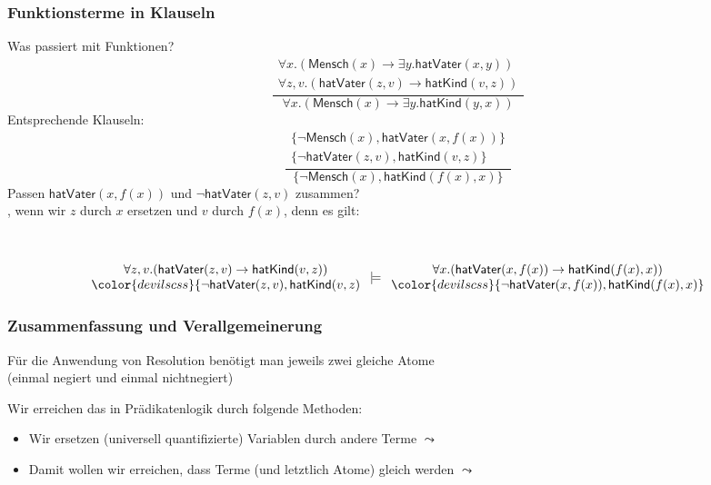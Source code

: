 \documentclass[aspectratio=1610,onlymath]{beamer}
\begin{document}
\begin{frame}\frametitle{Funktionsterme in Klauseln}

Was passiert mit Funktionen?
%
\[ \frac{
\begin{array}{c}
\forall x.(\textsf{Mensch}(x)\to\exists y.\textsf{hatVater}(x,y))\\
\forall z,v.(\textsf{hatVater}(z,v)\to\textsf{hatKind}(v,z))
\end{array}
}
{
\forall x.(\textsf{Mensch}(x)\to\exists y.\textsf{hatKind}(y,x))
}
\]
%
Entsprechende Klauseln:
\[ \frac{
\begin{array}{c}
\{\neg\textsf{Mensch}(x),\textsf{hatVater}(x,f(x))\}\\
\{\neg\textsf{hatVater}(z,v),\textsf{hatKind}(v,z)\}
\end{array}
}
{
\{\neg\textsf{Mensch}(x),\textsf{hatKind}(f(x),x)\}
}
\]
Passen $\textsf{hatVater}(x,f(x))$ und $\neg\textsf{hatVater}(z,v)$ zusammen?\\\pause
{}, wenn wir $z$ durch $x$ ersetzen und $v$ durch $f(x)$, denn es gilt:

~\hspace{-1cm}%
\begin{minipage}{8cm}
\footnotesize
\[\begin{array}{c}
\forall z,v.(\textsf{hatVater}(z,v)\to\textsf{hatKind}(v,z))\\
{\color{devilscss}\{\neg\textsf{hatVater}(z,v),\textsf{hatKind}(v,z)}
\end{array}
\models
\begin{array}{c}
\forall x.(\textsf{hatVater}(x,f(x))\to\textsf{hatKind}(f(x),x))\\
{\color{devilscss}\{\neg\textsf{hatVater}(x,f(x)),\textsf{hatKind}(f(x),x)\}}
\end{array}
\]
\end{minipage}

\end{frame}

\begin{frame}\frametitle{Zusammenfassung und Verallgemeinerung}

Für die Anwendung von Resolution benötigt man jeweils zwei gleiche Atome\\ (einmal negiert und einmal nichtnegiert)\medskip

Wir erreichen das in Prädikatenlogik durch folgende Methoden:
\begin{itemize}
\item Wir ersetzen (universell quantifizierte) Variablen durch andere Terme $\leadsto$~
\item Damit wollen wir erreichen, dass Terme (und letztlich Atome) gleich werden $\leadsto$~
\end{itemize}

\end{frame}
\end{document}
